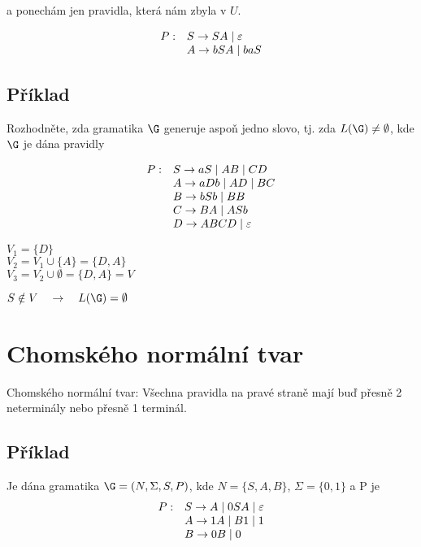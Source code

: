 a ponechám jen pravidla, která nám zbyla v $U$. 

\[
    \begin{array}{l l}
        P: & S \rightarrow SA \mid \varepsilon \\
           & A \rightarrow bSA \mid baS \\
    \end{array}
\]

\subsection{Příklad} %

Rozhodněte, zda gramatika $\G$ generuje aspoň jedno slovo, tj. zda $L(\G) \neq \emptyset$, kde $\G$ je dána pravidly 

\[
\begin{array}{l l}
    P: & S \rightarrow aS \mid AB \mid CD \\
       & A \rightarrow aDb \mid AD \mid BC \\
       & B \rightarrow bSb \mid BB \\
       & C \rightarrow BA \mid ASb \\
       & D \rightarrow ABCD \mid \varepsilon \\
\end{array}
\]

$V_1 = \{D\}$\\ 
$V_2 = V_1 \cup \{A\} = \{D, A\}$\\ 
$V_3 = V_2 \cup \emptyset = \{D, A\} = V$

$S \notin V \quad \rightarrow \quad L(\G) = \emptyset$ 

\section*{Chomského normální tvar}

Chomského normální tvar: Všechna pravidla na pravé straně mají buď přesně 2 neterminály nebo přesně 1 terminál. 

\subsection{Příklad} %

Je dána gramatika $\G = (N, \Sigma, S, P)$, kde $N = \{S, A, B\}$, $\Sigma = \{0, 1\}$ a P je 
\[
\begin{array}{l l}
    P: & S \rightarrow A \mid 0SA \mid \varepsilon \\
       & A \rightarrow 1A \mid B1 \mid 1 \\
       & B \rightarrow 0B \mid 0 \\
\end{array}
\]

